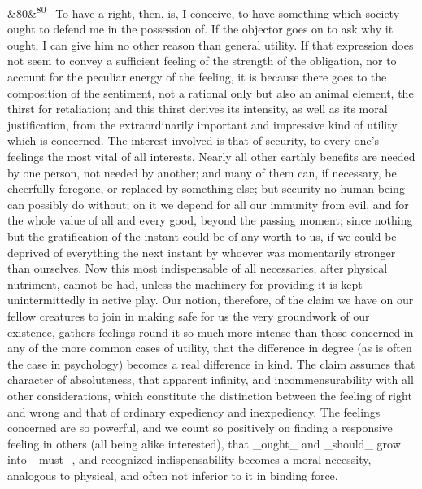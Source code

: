 \documentclass[12pt]{article}
\newcommand{\para}[1][]{\par\noindent\ifx&#1&\else\textsuperscript{\footnotesize #1}~\fi}
\begin{document}
\para[80] To have a right, then, is, I conceive, to have something which society ought to defend me in the possession of. If the objector goes on to ask why it ought, I can give him no other reason than general utility. If that expression does not seem to convey a sufficient feeling of the strength of the obligation, nor to account for the peculiar energy of the feeling, it is because there goes to the composition of the sentiment, not a rational only but also an animal element, the thirst for retaliation; and this thirst derives its intensity, as well as its moral justification, from the extraordinarily important and impressive kind of utility which is concerned. The interest involved is that of security, to every one's feelings the most vital of all interests. Nearly all other earthly benefits are needed by one person, not needed by another; and many of them can, if necessary, be cheerfully foregone, or replaced by something else; but security no human being can possibly do without; on it we depend for all our immunity from evil, and for the whole value of all and every good, beyond the passing moment; since nothing but the gratification of the instant could be of any worth to us, if we could be deprived of everything the next instant by whoever was momentarily stronger than ourselves. Now this most indispensable of all necessaries, after physical nutriment, cannot be had, unless the machinery for providing it is kept unintermittedly in active play. Our notion, therefore, of the claim we have on our fellow creatures to join in making safe for us the very groundwork of our existence, gathers feelings round it so much more intense than those concerned in any of the more common cases of utility, that the difference in degree (as is often the case in psychology) becomes a real difference in kind. The claim assumes that character of absoluteness, that apparent infinity, and incommensurability with all other considerations, which constitute the distinction between the feeling of right and wrong and that of ordinary expediency and inexpediency. The feelings concerned are so powerful, and we count so positively on finding a responsive feeling in others (all being alike interested), that \_ought\_ and \_should\_ grow into \_must\_, and recognized indispensability becomes a moral necessity, analogous to physical, and often not inferior to it in binding force.
\end{document}
